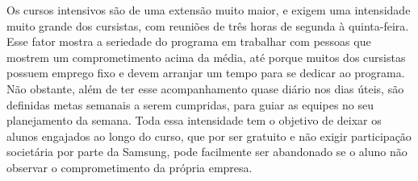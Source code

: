Os cursos intensivos são de uma extensão muito maior, e exigem uma intensidade muito grande dos cursistas, com reuniões de três horas de segunda à quinta-feira. Esse fator mostra a seriedade do programa em trabalhar com pessoas que mostrem um comprometimento acima da média, até porque muitos dos cursistas possuem emprego fixo e devem arranjar um tempo para se dedicar ao programa. Não obstante, além de ter esse acompanhamento quase diário nos dias úteis, são definidas metas semanais a serem cumpridas, para guiar as equipes no seu planejamento da semana. Toda essa intensidade tem o objetivo de deixar os alunos engajados ao longo do curso, que por ser gratuito e não exigir participação societária por parte da Samsung, pode facilmente ser abandonado se o aluno não observar o comprometimento da própria empresa.